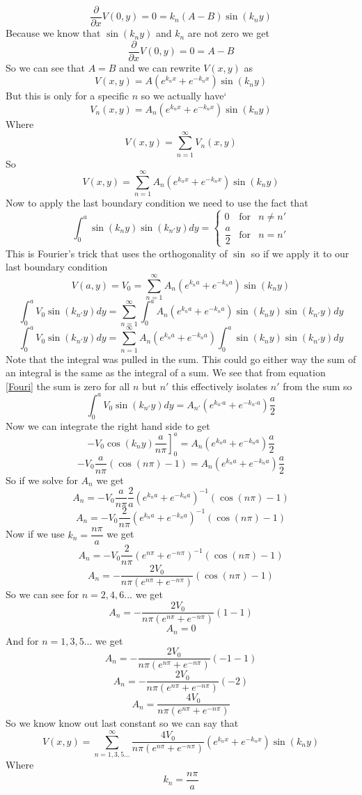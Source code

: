 \documentclass[11pt]{article}
\numberwithin{equation}{section}
\begin{document}
\begin{enumerate}[(i)]
$$\frac{\partial}{\partial x}V(0,y) =0= k_n\left(A-B\right)\sin(k_ny)$$
Because we know that $\sin(k_ny)$ and $k_n$ are not zero we get 
$$\frac{\partial}{\partial x}V(0,y) =0= A-B$$
So we can see that $A=B$ and we can rewrite $V(x,y)$ as
$$V(x,y)=A\left(e^{k_nx}+e^{-k_nx}\right)\sin(k_ny)$$
But this is only for a specific $n$ so we actually have`
$$V_n(x,y)=A_n\left(e^{k_nx}+e^{-k_nx}\right)\sin(k_ny)$$
Where 
$$V(x,y) = \sum_{n=1}^{\infty} V_n(x,y)$$
So 
$$V(x,y) = \sum_{n=1}^{\infty} A_n\left(e^{k_nx}+e^{-k_nx}\right)\sin(k_ny)$$
Now to apply the last boundary condition we need to use the fact that 
\begin{equation}
\int_0^a\sin(k_ny)\sin(k_{n'}y)dy = \left\{ \begin{array}{rcc}
					0 &\mbox{for} &n\neq n' \\
					\dfrac{a}{2} &\mbox{for} &n=n'
					\end{array}\right.
\label{Fouri}
\end{equation}
This is Fourier's trick that uses the orthogonality of $\sin$ so if we apply it to our last boundary condition
$$V(a,y)= V_0 = \sum_{n=1}^{\infty} A_n\left(e^{k_na}+e^{-k_na}\right)\sin(k_ny)$$
$$\int_0^aV_0\sin(k_{n'}y)dy = \sum_{n=1}^{\infty} \int_0^aA_n\left(e^{k_na}+e^{-k_na}\right)\sin(k_ny)\sin(k_{n'}y)dy$$
$$\int_0^aV_0\sin(k_{n'}y)dy = \sum_{n=1}^{\infty} A_n\left(e^{k_na}+e^{-k_na}\right)\int_0^a\sin(k_ny)\sin(k_{n'}y)dy$$
Note that the integral was pulled in the sum. This could go either way the sum of an integral is the same as the integral of a sum. We see that from equation \ref{Fouri} the sum is zero for all $n$ but $n'$ this effectively isolates $n'$ from the sum so 
$$\int_0^aV_0\sin(k_{n'}y)dy = A_{n'}\left(e^{k_{n'}a}+e^{-k_{n'}a}\right)\frac{a}{2}$$
Now we can integrate the right hand side to get
$$\left.-V_0\cos(k_{n}y)\frac{a}{n\pi}\right]_0^a = A_{n}\left(e^{k_{n}a}+e^{-k_{n}a}\right)\frac{a}{2}$$
$$-V_0\frac{a}{n\pi}(\cos(n\pi)-1) = A_{n}\left(e^{k_{n}a}+e^{-k_{n}a}\right)\frac{a}{2}$$
So if we solve for $A_n$ we get 
$$A_n= -V_0\frac{a}{n\pi}\frac{2}{a}\left(e^{k_{n}a}+e^{-k_{n}a}\right)^{-1}(\cos(n\pi)-1)$$
$$A_n= -V_0\frac{2}{n\pi}\left(e^{k_{n}a}+e^{-k_{n}a}\right)^{-1}(\cos(n\pi)-1)$$
Now if we use $k_n = \dfrac{n\pi}{a}$ we get
$$A_n= -V_0\frac{2}{n\pi}\left(e^{n\pi}+e^{-n\pi}\right)^{-1}(\cos(n\pi)-1)$$
$$A_n= -\frac{2V_0}{n\pi\left(e^{n\pi}+e^{-n\pi}\right)}(\cos(n\pi)-1)$$
So we can see for $n=2,4,6...$ we get
$$A_n= -\frac{2V_0}{n\pi\left(e^{n\pi}+e^{-n\pi}\right)}(1-1)$$
$$A_n= 0$$
And for $n=1,3,5...$ we get
$$A_n= -\frac{2V_0}{n\pi\left(e^{n\pi}+e^{-n\pi}\right)}(-1-1)$$
$$A_n= -\frac{2V_0}{n\pi\left(e^{n\pi}+e^{-n\pi}\right)}(-2)$$
$$A_n= \frac{4V_0}{n\pi\left(e^{n\pi}+e^{-n\pi}\right)}$$
So we know know out last constant so we can say that
$$V(x,y) = \sum_{n=1,3,5...}^{\infty}\frac{4V_0}{n\pi\left(e^{n\pi}+e^{-n\pi}\right)}\left(e^{k_nx}+e^{-k_nx}\right)\sin(k_ny)$$
Where
$$k_n = \frac{n\pi}{a}$$


\end{enumerate}
\end{document}
